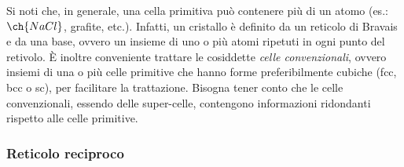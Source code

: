 Si noti che, in generale, una cella primitiva può contenere più di un atomo (es.: $ \ch{Na Cl} $, grafite, etc.). Infatti, un cristallo è definito da un reticolo di Bravais e da una base, ovvero un insieme di uno o più atomi ripetuti in ogni punto del retivolo. È inoltre conveniente trattare le cosiddette \textit{celle convenzionali}, ovvero insiemi di una o più celle primitive che hanno forme preferibilmente cubiche (fcc, bcc o sc), per facilitare la trattazione. Bisogna tener conto che le celle convenzionali, essendo delle super-celle, contengono informazioni ridondanti rispetto alle celle primitive.

\subsubsection{Reticolo reciproco}

